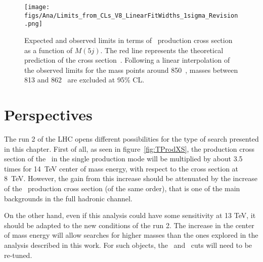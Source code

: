 \begin{figure}[!Hhtbp]
  \begin{center}
    \texttt{[image: figs/Ana/Limits\_from\_CLs\_V8\_LinearFitWidths\_1sigma\_Revision.png]}
    \caption{Expected and observed limits in terms of \Tp~production cross section as a function of $M(5j)$. The red line represents the theoretical prediction of the cross section~\cite{Buchkremer:2013bha, Cacciapaglia:2011fx}. Following a linear interpolation of the observed limits for the mass points around 850~\GeVcc, masses between 813 and 862 \GeVcc~are excluded at 95\% CL.}
    \label{fig:Lim}
  \end{center}
\end{figure}

\section{Perspectives}
\label{sec:pers}

The run 2 of the LHC opens different possibilities for the type of search presented in this chapter. First of all, as seen in figure~\ref{fig:TProdXS}, the production cross section of the \Tp~in the single production mode will be multiplied by about 3.5 times for 14~TeV center of mass energy, with respect to the cross section at 8~TeV. However, the gain from this increase should be attenuated by the increase of the \ttbar~production cross section (of the same order), that is one of the main backgrounds in the full hadronic channel. 

On the other hand, even if this analysis could have some sensitivity at 13 TeV, it should be adapted to the new conditions of the run 2. The increase in the center of mass energy will allow searches for higher masses than the ones explored in the analysis described in this work. For such objects, the \pt~and \HT~cuts will need to be re-tuned. %

